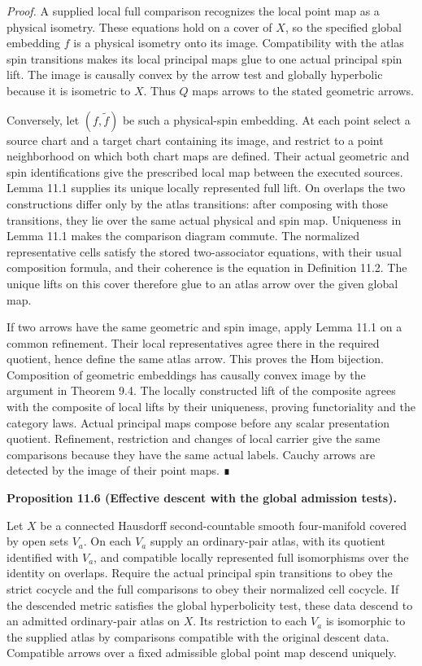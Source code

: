 \documentclass[
  english,
  11pt,
  reqno]{amsart}
\makeatletter
\newcommand{\pandocstatementheading}[1]{%
  \par\if@nobreak\else
    \addpenalty{\@beginparpenalty}%
    \addvspace{.5\baselineskip plus .2\baselineskip minus .2\baselineskip}%
  \fi
  {\normalfont\bfseries #1\par}%
  \nobreak\@afterindenttrue\@afterheading
}
\makeatother
\begin{document}
\emph{Proof.} A supplied local full comparison recognizes the local
point map as a physical isometry. These equations hold on a cover of
\(X\), so the specified global embedding \(f\) is a physical isometry
onto its image. Compatibility with the atlas spin transitions makes its
local principal maps glue to one actual principal spin lift. The image
is causally convex by the arrow test and globally hyperbolic because it
is isometric to \(X\). Thus \(Q\) maps arrows to the stated geometric
arrows.

Conversely, let \((f,\widetilde f)\) be such a physical-spin embedding.
At each point select a source chart and a target chart containing its
image, and restrict to a point neighborhood on which both chart maps are
defined. Their actual geometric and spin identifications give the
prescribed local map between the executed sources. Lemma 11.1 supplies
its unique locally represented full lift. On overlaps the two
constructions differ only by the atlas transitions: after composing with
those transitions, they lie over the same actual physical and spin map.
Uniqueness in Lemma 11.1 makes the comparison diagram commute. The
normalized representative cells satisfy the stored two-associator
equations, with their usual composition formula, and their coherence is
the equation in Definition 11.2. The unique lifts on this cover
therefore glue to an atlas arrow over the given global map.

If two arrows have the same geometric and spin image, apply Lemma 11.1
on a common refinement. Their local representatives agree there in the
required quotient, hence define the same atlas arrow. This proves the
Hom bijection. Composition of geometric embeddings has causally convex
image by the argument in Theorem 9.4. The locally constructed lift of
the composite agrees with the composite of local lifts by their
uniqueness, proving functoriality and the category laws. Actual
principal maps compose before any scalar presentation quotient.
Refinement, restriction and changes of local carrier give the same
comparisons because they have the same actual labels. Cauchy arrows are
detected by the image of their point maps. ∎

\pandocstatementheading{\protect{}\label{prop:ordinary-atlas-effective-descent}Proposition 11.6 (Effective descent with the global admission tests).}

Let \(X\) be a connected Hausdorff second-countable smooth four-manifold
covered by open sets \(V_a\). On each \(V_a\) supply an ordinary-pair
atlas, with its quotient identified with \(V_a\), and compatible locally
represented full isomorphisms over the identity on overlaps. Require the
actual principal spin transitions to obey the strict cocycle and the
full comparisons to obey their normalized cell cocycle. If the descended
metric satisfies the global hyperbolicity test, these data descend to an
admitted ordinary-pair atlas on \(X\). Its restriction to each \(V_a\)
is isomorphic to the supplied atlas by comparisons compatible with the
original descent data. Compatible arrows over a fixed admissible global
point map descend uniquely.
\end{document}
